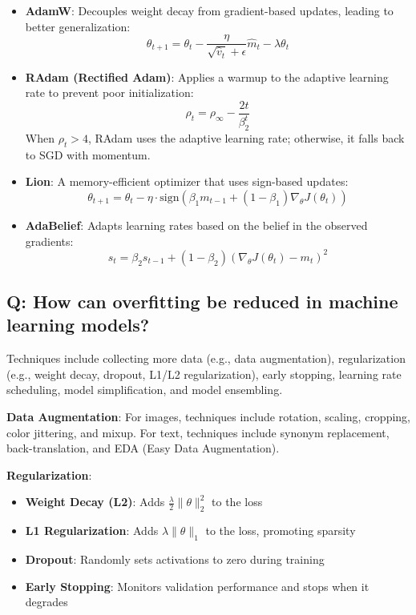 \begin{itemize}
	\item \textbf{AdamW}: Decouples weight decay from gradient-based updates, leading to better generalization:
	\[
	\theta_{t+1} = \theta_t - \frac{\eta}{\sqrt{\hat{v}_t} + \epsilon} \hat{m}_t - \lambda \theta_t
	\]
	
	\item \textbf{RAdam (Rectified Adam)}: Applies a warmup to the adaptive learning rate to prevent poor initialization:
	\[
	\rho_t = \rho_\infty - \frac{2t}{\beta_2^t}
	\]
	When \(\rho_t > 4\), RAdam uses the adaptive learning rate; otherwise, it falls back to SGD with momentum.
	
	\item \textbf{Lion}: A memory-efficient optimizer that uses sign-based updates:
	\[
	\theta_{t+1} = \theta_t - \eta \cdot \text{sign}(\beta_1 m_{t-1} + (1-\beta_1) \nabla_\theta J(\theta_t))
	\]
	
	\item \textbf{AdaBelief}: Adapts learning rates based on the belief in the observed gradients:
	\[
	s_t = \beta_2 s_{t-1} + (1-\beta_2) (\nabla_\theta J(\theta_t) - m_t)^2
	\]
\end{itemize}

\subsection*{Q: How can overfitting be reduced in machine learning models?}
Techniques include collecting more data (e.g., data augmentation), regularization (e.g., weight decay, dropout, L1/L2 regularization), early stopping, learning rate scheduling, model simplification, and model ensembling.

\textbf{Data Augmentation}: For images, techniques include rotation, scaling, cropping, color jittering, and mixup. For text, techniques include synonym replacement, back-translation, and EDA (Easy Data Augmentation).

\textbf{Regularization}: 
\begin{itemize}
	\item \textbf{Weight Decay (L2)}: Adds \(\frac{\lambda}{2} \|\theta\|_2^2\) to the loss
	\item \textbf{L1 Regularization}: Adds \(\lambda \|\theta\|_1\) to the loss, promoting sparsity
	\item \textbf{Dropout}: Randomly sets activations to zero during training
	\item \textbf{Early Stopping}: Monitors validation performance and stops when it degrades
\end{itemize}

